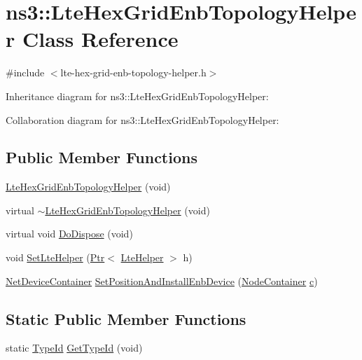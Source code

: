 \hypertarget{classns3_1_1LteHexGridEnbTopologyHelper}{}\section{ns3\+:\+:Lte\+Hex\+Grid\+Enb\+Topology\+Helper Class Reference}
\label{classns3_1_1LteHexGridEnbTopologyHelper}


{\ttfamily \#include $<$lte-\/hex-\/grid-\/enb-\/topology-\/helper.\+h$>$}



Inheritance diagram for ns3\+:\+:Lte\+Hex\+Grid\+Enb\+Topology\+Helper\+:


Collaboration diagram for ns3\+:\+:Lte\+Hex\+Grid\+Enb\+Topology\+Helper\+:
\subsection*{Public Member Functions}
\begin{DoxyCompactItemize}
\item 
\hyperlink{classns3_1_1LteHexGridEnbTopologyHelper_afe6e79fee14eaa61d46e8b1ebce30dc5}{Lte\+Hex\+Grid\+Enb\+Topology\+Helper} (void)
\item 
virtual \hyperlink{classns3_1_1LteHexGridEnbTopologyHelper_a770fa94b1b2809bfd781c81cd648de7d}{$\sim$\+Lte\+Hex\+Grid\+Enb\+Topology\+Helper} (void)
\item 
virtual void \hyperlink{classns3_1_1LteHexGridEnbTopologyHelper_a9dd3538f1e27566e34639c8130dde206}{Do\+Dispose} (void)
\item 
void \hyperlink{classns3_1_1LteHexGridEnbTopologyHelper_addb17227a4a8500c37e24cadc81d84e5}{Set\+Lte\+Helper} (\hyperlink{classns3_1_1Ptr}{Ptr}$<$ \hyperlink{classns3_1_1LteHelper}{Lte\+Helper} $>$ h)
\item 
\hyperlink{classns3_1_1NetDeviceContainer}{Net\+Device\+Container} \hyperlink{classns3_1_1LteHexGridEnbTopologyHelper_ad16fb01e9df27659bb1c4328542e07d6}{Set\+Position\+And\+Install\+Enb\+Device} (\hyperlink{classns3_1_1NodeContainer}{Node\+Container} \hyperlink{mmwave_2model_2fading-traces_2fading__trace__generator_8m_ae0323a9039add2978bf5b49550572c7c}{c})
\end{DoxyCompactItemize}
\subsection*{Static Public Member Functions}
\begin{DoxyCompactItemize}
\item 
static \hyperlink{classns3_1_1TypeId}{Type\+Id} \hyperlink{classns3_1_1LteHexGridEnbTopologyHelper_a49c7454ea0bbac13a7fab8f848c897bb}{Get\+Type\+Id} (void)
\end{DoxyCompactItemize}

